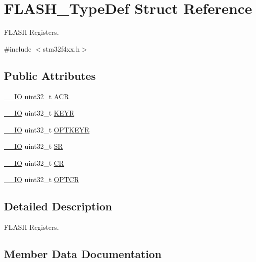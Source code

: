 \hypertarget{struct_f_l_a_s_h___type_def}{}\section{F\+L\+A\+S\+H\+\_\+\+Type\+Def Struct Reference}
\label{struct_f_l_a_s_h___type_def}


F\+L\+A\+SH Registers.  




{\ttfamily \#include $<$stm32f4xx.\+h$>$}

\subsection*{Public Attributes}
\begin{DoxyCompactItemize}
\item 
\hyperlink{core__cm4_8h_aec43007d9998a0a0e01faede4133d6be}{\+\_\+\+\_\+\+IO} uint32\+\_\+t \hyperlink{struct_f_l_a_s_h___type_def_aaf432a8a8948613f4f66fcace5d2e5fe}{A\+CR}
\item 
\hyperlink{core__cm4_8h_aec43007d9998a0a0e01faede4133d6be}{\+\_\+\+\_\+\+IO} uint32\+\_\+t \hyperlink{struct_f_l_a_s_h___type_def_a802e9a26a89b44decd2d32d97f729dd3}{K\+E\+YR}
\item 
\hyperlink{core__cm4_8h_aec43007d9998a0a0e01faede4133d6be}{\+\_\+\+\_\+\+IO} uint32\+\_\+t \hyperlink{struct_f_l_a_s_h___type_def_a793cd13a4636c9785fdb99316f7fd7ab}{O\+P\+T\+K\+E\+YR}
\item 
\hyperlink{core__cm4_8h_aec43007d9998a0a0e01faede4133d6be}{\+\_\+\+\_\+\+IO} uint32\+\_\+t \hyperlink{struct_f_l_a_s_h___type_def_a52c4943c64904227a559bf6f14ce4de6}{SR}
\item 
\hyperlink{core__cm4_8h_aec43007d9998a0a0e01faede4133d6be}{\+\_\+\+\_\+\+IO} uint32\+\_\+t \hyperlink{struct_f_l_a_s_h___type_def_a7919306d0e032a855200420a57f884d7}{CR}
\item 
\hyperlink{core__cm4_8h_aec43007d9998a0a0e01faede4133d6be}{\+\_\+\+\_\+\+IO} uint32\+\_\+t \hyperlink{struct_f_l_a_s_h___type_def_a54026c3b5bc2059f1b187acb6c4817ac}{O\+P\+T\+CR}
\end{DoxyCompactItemize}


\subsection{Detailed Description}
F\+L\+A\+SH Registers. 

\subsection{Member Data Documentation}
